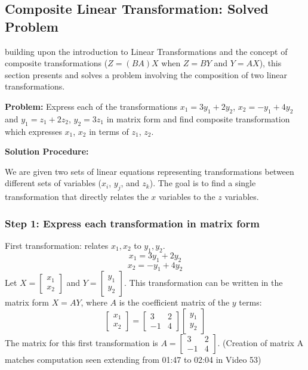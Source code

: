 \documentclass{article}
\begin{document}

\subsection{Composite Linear Transformation: Solved Problem} %

 building upon the introduction to Linear Transformations and the concept of composite transformations ($Z=(BA)X$ when $Z=BY$ and $Y=AX$), this section presents and solves a problem involving the composition of two linear transformations.

\textbf{Problem:}
Express each of the transformations $x_1 = 3y_1 + 2y_2$, $x_2 = -y_1 + 4y_2$ and $y_1 = z_1 + 2z_2$, $y_2 = 3z_1$ in matrix form and find composite transformation which expresses $x_1$, $x_2$ in terms of $z_1$, $z_2$.

\textbf{Solution Procedure:}

We are given two sets of linear equations representing transformations between different sets of variables ($x_i$, $y_j$, and $z_k$). The goal is to find a single transformation that directly relates the $x$ variables to the $z$ variables.

\subsubsection*{Step 1: Express each transformation in matrix form}

First transformation: relates $x_1, x_2$ to $y_1, y_2$.
\[ x_1 = 3y_1 + 2y_2 \]
\[ x_2 = -y_1 + 4y_2 \]
Let $X = \begin{bmatrix} x_1 \\ x_2 \end{bmatrix}$ and $Y = \begin{bmatrix} y_1 \\ y_2 \end{bmatrix}$.
This transformation can be written in the matrix form $X = AY$, where $A$ is the coefficient matrix of the $y$ terms:
\[ \begin{bmatrix} x_1 \\ x_2 \end{bmatrix} = \begin{bmatrix} 3 & 2 \\ -1 & 4 \end{bmatrix} \begin{bmatrix} y_1 \\ y_2 \end{bmatrix} \]
The matrix for this first transformation is $A = \begin{bmatrix} 3 & 2 \\ -1 & 4 \end{bmatrix}$.
(Creation of matrix A matches computation seen extending from 01:47 to 02:04 in Video 53)
\end{document}
